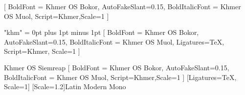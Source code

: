 \usepackage[no-math]{fontspec}
\setsansfont{Khmer OS Siemreap}[
	BoldFont = Khmer OS Bokor,
	AutoFakeSlant=0.15,
	BoldItalicFont = Khmer OS Muol,
	Script=Khmer,Scale=1
]
\usepackage[Khmer, Latin]{../ucharclasses}
\usepackage{etoolbox}
\XeTeXlinebreaklocale "khm"
\XeTeXlinebreakskip = 0pt plus 1pt minus 1pt
\setmainfont{Khmer OS Siemreap}
[	
	BoldFont = Khmer OS Bokor,
	AutoFakeSlant=0.15,
	BoldItalicFont = Khmer OS Muol,
	Ligatures=TeX,
	Script=Khmer,
	Scale=1
]


\newfontfamily{\khmerfamily}
{Khmer OS Siemreap}
[
	BoldFont = Khmer OS Bokor,
	AutoFakeSlant=0.15,
	BoldItalicFont = Khmer OS Muol,
	Script=Khmer,Scale=1
]
[Ligatures=TeX, Scale=1]
\newfontfamily{\monofamily}[Scale=1.2]{Latin Modern Mono}


\newrobustcmd{\englishfont}{
	\englishfamily
	\let\currentenglish
	\englishfamily
}
\newrobustcmd{\khmerfont}{
	\khmerfamily
	\let\currentkhmer
	\khmerfamily
}


\newrobustcmd{\mono}{
	\monofamily\let\currentenglish
	\monofamily
}
\newrobustcmd{\ENlatin}{
	\latinfamily\let\currentenglish
	\latinfamily
}
\newrobustcmd{\ENjetbrains}{
	\jetbrainsfamily\let\currentenglish
	\jetbrainsfamily
}

\renewcommand{\tt}{\mono}

\khmerfont\englishfont
\setTransitionsForLatin{\currentenglish}{\currentkhmer}


\usepackage{bbold}
\let\altmathbb\mathbb
\AtBeginDocument{\let\mathbb\altmathbb}

\let\temp\rmdefault
\usepackage{mathpazo}
\let\rmdefault\temp



\newcommand{\kml}
{
	\fontspec[
		Script=Khmer, Scale=1,
		AutoFakeBold=1, AutoFakeSlant=0.25
	] {Khmer OS Muol Light}
	\selectfont
}

\newcommand{\km}
{
	\fontspec[
		Script=Khmer, Scale=1,
		AutoFakeBold=1, AutoFakeSlant=0.25
	] {Khmer OS Muol}
	\selectfont
}

\newcommand{\kpali}
{
	\fontspec[
		Script=Khmer, Scale=1,
		AutoFakeBold=1, AutoFakeSlant=0.25
	] {Khmer OS Muol Pali}
	\selectfont
}

